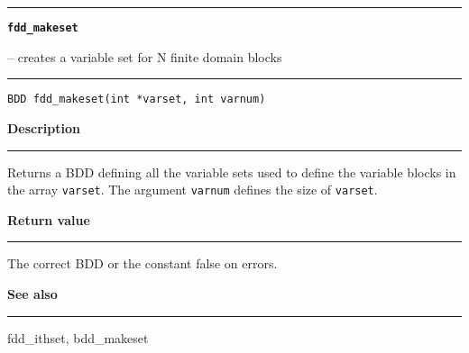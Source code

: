 \begin{minipage}{\textwidth}

\noindent\begin{minipage}{\textwidth}
\rule{\textwidth}{0.5mm}
{\tt\bf fdd\_makeset }
\--- creates a variable set for N finite domain blocks  \hspace{\fill}
\\\rule[1.5ex]{\textwidth}{0.5mm}
\end{minipage}

\noindent\begin{verbatim}
BDD fdd_makeset(int *varset, int varnum) 
\end{verbatim}

\vspace{\parsep}\noindent
{\bf Description}\\\rule[1.5ex]{\textwidth}{0.2mm}\vspace{-1.5ex}\setlength{\parindent}{1em}
Returns a BDD defining all the variable sets used to define
           the variable blocks in the array {\tt varset}. The argument
	   {\tt varnum} defines the size of {\tt varset}. 

\setlength{\parindent}{0em}\vspace{\parsep}\vspace{\baselineskip}\noindent
{\bf Return value}\\\rule[1.5ex]{\textwidth}{0.2mm}\vspace{-1.5ex}
The correct BDD or the constant false on errors. 

\vspace{\parsep}\vspace{\baselineskip}\noindent
{\bf See also}\\\rule[1.5ex]{\textwidth}{0.2mm}\vspace{-1.5ex}
fdd\_ithset, bdd\_makeset 
\end{minipage}
\vspace{8ex}
